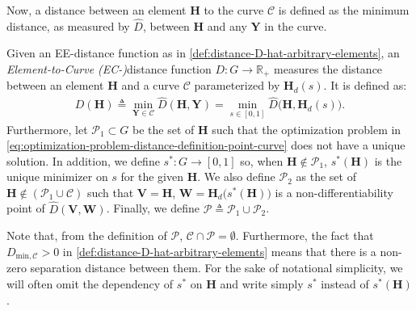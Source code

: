 Now, a distance between an element $\mathbf{H}$ to the curve $\mathcal{C}$ is defined as the minimum distance, as measured by $\widehat{D}$, between $\mathbf{H}$ and any $\mathbf{Y}$ in the curve. 
\begin{definition}\label{def:distance-D-element-curve}
    Given an EE-distance function as in \cref{def:distance-D-hat-arbitrary-elements}, an \emph{Element-to-Curve (EC-)}distance function $D: G\to\mathbb{R}_+$ measures the distance between an element $\mathbf{H}$ and a curve $\mathcal{C}$ parameterized by $\mathbf{H}_d(s)$. It is defined as:
    \begin{align}
        D(\mathbf{H}) \triangleq \min_{\mathbf{Y}\in\mathcal{C}}\widehat{D}(\mathbf{H}, \mathbf{Y}) =
        \min_{s\in[0,1]} \widehat{D}\bigl(\mathbf{H}, \mathbf{H}_d(s)\bigr).\label{eq:optimization-problem-distance-definition-point-curve}
    \end{align}
    Furthermore, let $\mathcal{P}_1\subset G$ be the set of $\mathbf{H}$ such that the optimization problem in \eqref{eq:optimization-problem-distance-definition-point-curve} does not have a unique solution. In addition, we define $s^*: G \to [0,1]$ so, when $\mathbf{H}\notin \mathcal{P}_1$, $s^*(\mathbf{H})$ is the unique minimizer on $s$ for the given $\mathbf{H}$. %
    We also define $\mathcal{P}_2$ as the set of $\mathbf{H} \not \in (\mathcal{P}_1 \cup \mathcal{C})$ such that $\mathbf{V} = \mathbf{H}$, $\mathbf{W} = \mathbf{H}_d\bigl(s^*(\mathbf{H})\bigr)$ is a non-differentiability point of $\widehat{D}(\mathbf{V},\mathbf{W})$. Finally, we define $\mathcal{P} \triangleq \mathcal{P}_1 \cup \mathcal{P}_2$.
    
\end{definition}
Note that, from the definition of $\mathcal{P}$, $\mathcal{C} \cap \mathcal{P} = \emptyset$. Furthermore, the fact that $D_{\text{min},\mathcal{C}}>0$ in \cref{def:distance-D-hat-arbitrary-elements} means that there is a non-zero separation distance between them. For the sake of notational simplicity, we will often omit the dependency of $s^*$ on $\mathbf{H}$ and write simply $s^*$ instead of $s^*(\mathbf{H})$.

